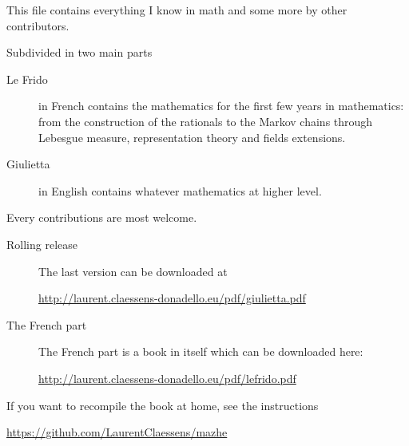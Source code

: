
\thispagestyle{empty}

This file contains everything I know in math and some more by other contributors.

Subdivided in two main parts
\begin{description}
	\item[Le Frido] in French contains the mathematics for the first few years in mathematics: from the construction of the rationals to the Markov chains through Lebesgue measure, representation theory and fields extensions.
	\item[Giulietta] in English contains whatever mathematics at higher level.
\end{description}

\begin{center}
	Every contributions are most welcome.
\end{center}

\vfill

\begin{description}
	\item[Rolling release]

	      The last version can be downloaded at
	      \begin{center}
		      \url{http://laurent.claessens-donadello.eu/pdf/giulietta.pdf}
	      \end{center}

	\item[The French part]
	      The French part is a book in itself which can be downloaded here:
	      \begin{center}
		      \url{http://laurent.claessens-donadello.eu/pdf/lefrido.pdf}
	      \end{center}

\end{description}

If you want to recompile the book at home, see the instructions
\begin{center}
	\url{https://github.com/LaurentClaessens/mazhe}
\end{center}
